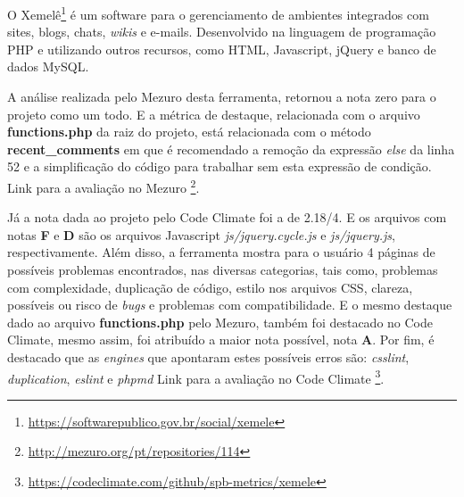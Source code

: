 O Xemelê\footnote{\url{https://softwarepublico.gov.br/social/xemele}} é um
software para o gerenciamento de ambientes integrados com sites, blogs, chats,
\textit{wikis} e e-mails. Desenvolvido na linguagem de programação PHP e
utilizando outros recursos, como HTML, Javascript, jQuery e banco de dados MySQL.

A análise realizada pelo Mezuro desta ferramenta, retornou a nota zero para o
projeto como um todo. E a métrica de destaque, relacionada com o arquivo
\textbf{functions.php} da raiz do projeto, está relacionada com o método
\textbf{recent\_comments} em que é recomendado a remoção da expressão
\textit{else} da linha 52 e a simplificação do código para trabalhar sem esta
expressão de condição. Link para a avaliação no Mezuro
\footnote{\url{http://mezuro.org/pt/repositories/114}}.

Já a nota dada ao projeto pelo Code Climate foi a de 2.18/4. E os arquivos com
notas \textbf{F} e \textbf{D} são os arquivos Javascript \textit{js/jquery.cycle.js}
e \textit{js/jquery.js}, respectivamente. Além disso, a ferramenta mostra para o
usuário 4 páginas de possíveis problemas encontrados, nas diversas categorias,
tais como, problemas com complexidade, duplicação de código, estilo nos arquivos
CSS, clareza, possíveis ou risco de \textit{bugs} e problemas com compatibilidade. E o
mesmo destaque dado ao arquivo \textbf{functions.php} pelo Mezuro, também foi
destacado no Code Climate, mesmo assim, foi atribuído a maior nota possível, nota
\textbf{A}. Por fim, é destacado que as \textit{engines} que apontaram estes possíveis
erros são: \textit{csslint}, \textit{duplication}, \textit{eslint} e
\textit{phpmd} Link para a avaliação no Code Climate
\footnote{\url{https://codeclimate.com/github/spb-metrics/xemele}}.

